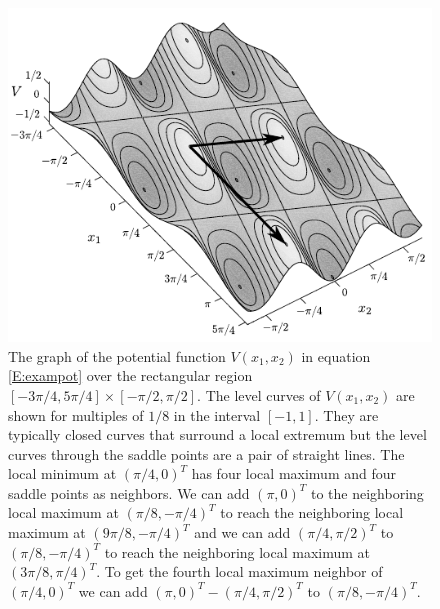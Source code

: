 \begin{figure}[ht]
\centering
\includegraphics[scale=1.20]{./images/Gradient1.pdf}
\caption{The graph of the potential function $V( x_1, x_2)$ in equation 
\eqref{E:exampot} over the rectangular region $[-3\pi/4,5\pi/4] \times 
[-\pi/2,\pi/2]$.  The level curves of $V( x_1, x_2)$ are shown for 
multiples of $1/8$ in the interval $[-1,1]$.  They are typically closed 
curves that surround a local extremum but the level curves through the saddle 
points are a pair of straight lines.  The local minimum at $(\pi/4,0)^T$ has 
four local maximum and four saddle points as neighbors.  We can add $(\pi,0)^T$
to the neighboring local maximum at $(\pi/8,-\pi/4)^T$ to reach the neighboring
local maximum at $(9\pi/8,-\pi/4)^T$ and we can add $(\pi/4,\pi/2)^T$ to 
$(\pi/8,-\pi/4)^T$ to reach the neighboring local maximum at 
$(3\pi/8,\pi/4)^T$.  To get the fourth local maximum neighbor of 
$(\pi/4,0)^T$ we can add $(\pi,0)^T - (\pi/4,\pi/2)^T$ to $(\pi/8,-\pi/4)^T$.}
\label{F:exampot}  
\end{figure}

